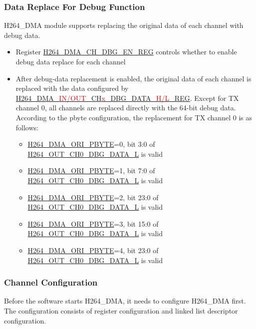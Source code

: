 \documentclass[main\_\_EN.tex]{subfiles}
\begin{document}
\subsubsection{Data Replace For Debug Function}\label{sec:h264-dma-debug}
H264\_DMA module supports replacing the original data of each channel with debug data.

\begin{itemize}
    \item Register \hyperref[regdesc:H264DMACHDBGENREG]{H264\_DMA\_CH\_DBG\_EN\_REG} controls whether to enable debug data replace for each channel
    \item After debug-data replacement is enabled, the original data of each channel is replaced with the data configured by \hyperref[regdesc:H264DMAOUTCH0DBGDATALREG]{H264\_DMA\_\textcolor{red}{IN/OUT}\_CH\textcolor{red}{x}\_DBG\_DATA\_\textcolor{red}{H/L}\_REG}. Except for TX channel 0, all channels are replaced directly with the 64-bit debug data. According to the pbyte configuration, the replacement for TX channel 0 is as follows:
    \begin{itemize}
        \item \hyperref[fielddesc:H264DMAORIPBYTE]{H264\_DMA\_ORI\_PBYTE}=0, bit 3:0 of \hyperref[fielddesc:H264OUTCH0DBGDATAL]{H264\_OUT\_CH0\_DBG\_DATA\_L} is valid
        \item \hyperref[fielddesc:H264DMAORIPBYTE]{H264\_DMA\_ORI\_PBYTE}=1, bit 7:0 of \hyperref[fielddesc:H264OUTCH0DBGDATAL]{H264\_OUT\_CH0\_DBG\_DATA\_L} is valid
        \item \hyperref[fielddesc:H264DMAORIPBYTE]{H264\_DMA\_ORI\_PBYTE}=2, bit 23:0 of \hyperref[fielddesc:H264OUTCH0DBGDATAL]{H264\_OUT\_CH0\_DBG\_DATA\_L} is valid
        \item \hyperref[fielddesc:H264DMAORIPBYTE]{H264\_DMA\_ORI\_PBYTE}=3, bit 15:0 of \hyperref[fielddesc:H264OUTCH0DBGDATAL]{H264\_OUT\_CH0\_DBG\_DATA\_L} is valid
        \item \hyperref[fielddesc:H264DMAORIPBYTE]{H264\_DMA\_ORI\_PBYTE}=4, bit 23:0 of \hyperref[fielddesc:H264OUTCH0DBGDATAL]{H264\_OUT\_CH0\_DBG\_DATA\_L} is valid
    \end{itemize}
\end{itemize}

\subsubsection{Channel Configuration}\label{sec:h264-dma-ch-cfg}
Before the software starts H264\_DMA, it needs to configure H264\_DMA first. The configuration consists of register configuration and linked list descriptor configuration.
\end{document}

